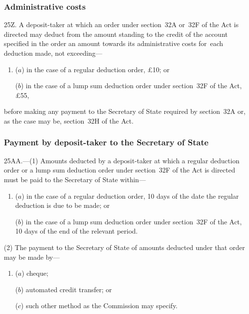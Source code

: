 \documentclass[12pt,a4paper]{article}
\begin{document}
\subsubsection[25Z. Administrative costs]{Administrative costs}

25Z.  A deposit-taker at which an order under section~32A or~32F of the Act is directed may deduct from the amount standing to the credit of the account specified in the order an amount towards its administrative costs for~each deduction made, not exceeding—
\begin{enumerate}\item[]
($a$) in the case of a regular deduction order, £10; or

($b$) in the case of a lump sum deduction order under section~32F of the Act, £55,
\end{enumerate}
before making any payment to the 
Secretary of State  %
required by section~32A or, as the case may be, section~32H of the Act.


\subsubsection[25AA. Payment by deposit-taker to the 
Secretary of State%
]{Payment by deposit-taker to the 
Secretary of State%
}

25AA.---(1)  Amounts deducted by a deposit-taker at which a regular deduction order or a lump sum deduction order under section~32F of the Act is directed must be paid to the 
Secretary of State  %
within—
\begin{enumerate}\item[]
($a$) in the case of a regular deduction order, 10 days of the date the regular deduction is due to be made; or

($b$) in the case of a lump sum deduction order under section~32F of the Act, 10 days of the end of the relevant period.
\end{enumerate}

(2) The payment to the 
Secretary of State  %
of amounts deducted under that order may be made by—
\begin{enumerate}\item[]
($a$) cheque;

($b$) automated credit transfer; or

($c$) such other method as the Commission may specify.
\end{enumerate}
\end{document}
